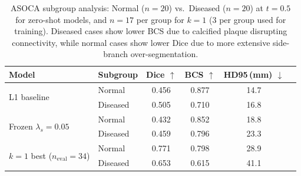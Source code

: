 \documentclass[runningheads]{llncs}
\begin{document}
\begin{table}[h]
\caption{ASOCA subgroup analysis: Normal ($n{=}20$) vs.\ Diseased ($n{=}20$) at $t{=}0.5$ for zero-shot models, and $n{=}17$ per group for $k{=}1$ (3 per group used for training). Diseased cases show lower BCS due to calcified plaque disrupting connectivity, while normal cases show lower Dice due to more extensive side-branch over-segmentation.}
\label{tab:asoca_subgroups}
\centering
\small
\begin{tabular}{llcccc}
\toprule
Model & Subgroup & Dice $\uparrow$ & BCS $\uparrow$ & HD95\,(mm) $\downarrow$ \\
\midrule
\multirow{2}{*}{L1 baseline}
 & Normal   & 0.456 & 0.877 & 14.7 \\
 & Diseased & 0.505 & 0.710 & 16.8 \\
\midrule
\multirow{2}{*}{Frozen $\lambda_s{=}0.05$}
 & Normal   & 0.432 & 0.852 & 18.8 \\
 & Diseased & 0.459 & 0.796 & 23.3 \\
\midrule
\multirow{2}{*}{$k{=}1$ best ($n_{\mathrm{eval}}{=}34$)}
 & Normal   & 0.771 & 0.798 & 28.9 \\
 & Diseased & 0.653 & 0.615 & 41.1 \\
\bottomrule
\end{tabular}
\end{table}
\end{document}
